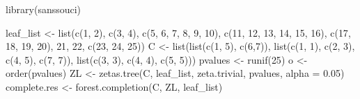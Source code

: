 \documentclass[
  11pt,
  a4paper,
]{article}
\newenvironment{Shaded}{}{}
\newcommand{\AttributeTok}[1]{\textcolor[rgb]{0.84,0.23,0.29}{#1}}
\newcommand{\DecValTok}[1]{\textcolor[rgb]{0.00,0.36,0.77}{#1}}
\newcommand{\FloatTok}[1]{\textcolor[rgb]{0.00,0.36,0.77}{#1}}
\newcommand{\FunctionTok}[1]{\textcolor[rgb]{0.44,0.26,0.76}{#1}}
\newcommand{\NormalTok}[1]{\textcolor[rgb]{0.14,0.16,0.18}{#1}}
\newcommand{\OtherTok}[1]{\textcolor[rgb]{0.44,0.26,0.76}{#1}}
\theoremstyle{definition}
\theoremstyle{plain}
\theoremstyle{plain}
\theoremstyle{plain}
\theoremstyle{definition}
\theoremstyle{remark}
\begin{document}
\begin{Shaded}
\begin{Highlighting}[]
\FunctionTok{library}\NormalTok{(sanssouci)}

\NormalTok{leaf\_list }\OtherTok{\textless{}{-}} \FunctionTok{list}\NormalTok{(}\FunctionTok{c}\NormalTok{(}\DecValTok{1}\NormalTok{, }\DecValTok{2}\NormalTok{), }
                  \FunctionTok{c}\NormalTok{(}\DecValTok{3}\NormalTok{, }\DecValTok{4}\NormalTok{), }
                  \FunctionTok{c}\NormalTok{(}\DecValTok{5}\NormalTok{, }\DecValTok{6}\NormalTok{, }\DecValTok{7}\NormalTok{, }\DecValTok{8}\NormalTok{, }\DecValTok{9}\NormalTok{, }\DecValTok{10}\NormalTok{), }
                  \FunctionTok{c}\NormalTok{(}\DecValTok{11}\NormalTok{, }\DecValTok{12}\NormalTok{, }\DecValTok{13}\NormalTok{, }\DecValTok{14}\NormalTok{, }\DecValTok{15}\NormalTok{, }\DecValTok{16}\NormalTok{), }
                  \FunctionTok{c}\NormalTok{(}\DecValTok{17}\NormalTok{, }\DecValTok{18}\NormalTok{, }\DecValTok{19}\NormalTok{, }\DecValTok{20}\NormalTok{), }
                  \DecValTok{21}\NormalTok{, }
                  \DecValTok{22}\NormalTok{, }
                  \FunctionTok{c}\NormalTok{(}\DecValTok{23}\NormalTok{, }\DecValTok{24}\NormalTok{, }\DecValTok{25}\NormalTok{))}
\NormalTok{C }\OtherTok{\textless{}{-}} \FunctionTok{list}\NormalTok{(}\FunctionTok{list}\NormalTok{(}\FunctionTok{c}\NormalTok{(}\DecValTok{1}\NormalTok{, }\DecValTok{5}\NormalTok{), }\FunctionTok{c}\NormalTok{(}\DecValTok{6}\NormalTok{,}\DecValTok{7}\NormalTok{)),}
          \FunctionTok{list}\NormalTok{(}\FunctionTok{c}\NormalTok{(}\DecValTok{1}\NormalTok{, }\DecValTok{1}\NormalTok{), }\FunctionTok{c}\NormalTok{(}\DecValTok{2}\NormalTok{, }\DecValTok{3}\NormalTok{), }\FunctionTok{c}\NormalTok{(}\DecValTok{4}\NormalTok{, }\DecValTok{5}\NormalTok{), }\FunctionTok{c}\NormalTok{(}\DecValTok{7}\NormalTok{, }\DecValTok{7}\NormalTok{)),}
          \FunctionTok{list}\NormalTok{(}\FunctionTok{c}\NormalTok{(}\DecValTok{3}\NormalTok{, }\DecValTok{3}\NormalTok{), }\FunctionTok{c}\NormalTok{(}\DecValTok{4}\NormalTok{, }\DecValTok{4}\NormalTok{), }\FunctionTok{c}\NormalTok{(}\DecValTok{5}\NormalTok{, }\DecValTok{5}\NormalTok{)))}
\NormalTok{pvalues }\OtherTok{\textless{}{-}} \FunctionTok{runif}\NormalTok{(}\DecValTok{25}\NormalTok{)}
\NormalTok{o }\OtherTok{\textless{}{-}} \FunctionTok{order}\NormalTok{(pvalues)}
\NormalTok{ZL }\OtherTok{\textless{}{-}} \FunctionTok{zetas.tree}\NormalTok{(C, leaf\_list, zeta.trivial, pvalues, }\AttributeTok{alpha =} \FloatTok{0.05}\NormalTok{)}
\NormalTok{complete.res }\OtherTok{\textless{}{-}} \FunctionTok{forest.completion}\NormalTok{(C, ZL, leaf\_list)}

\end{Highlighting}
\end{Shaded}
\end{document}
